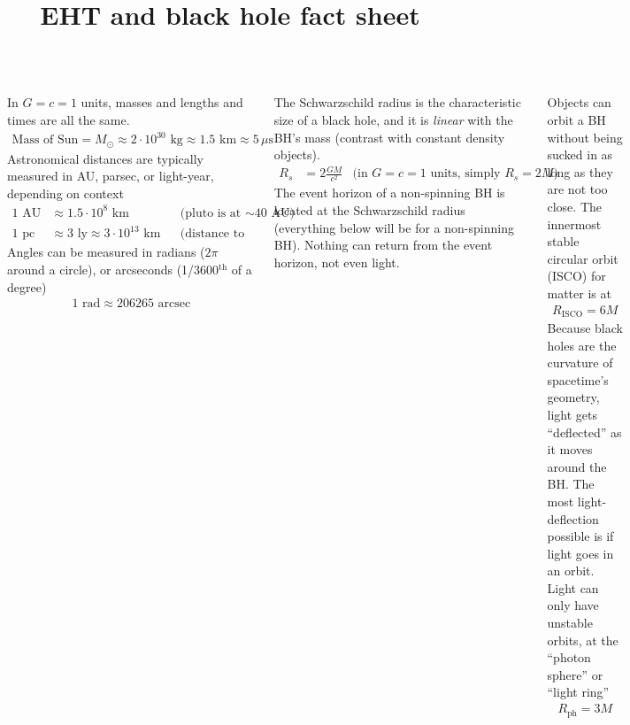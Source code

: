 \documentclass[25pt, a0paper, landscape]{tikzposter}
\title{EHT and black hole fact sheet}
\begin{document}
 
\maketitle

\linespread{1.25}

\begin{columns}
    {
      In $G=c=1$ units, masses and lengths and times are all the same.
      \begin{align*}
        \text{Mass of Sun} = M_{\odot} \approx 2\cdot 10^{30} \text{ kg}
        \approx 1.5 \text{ km} \approx 5 \, \mu\text{s}
      \end{align*}
      Astronomical distances are typically measured in AU, parsec, or
      light-year, depending on context
      \begin{align*}
        1 \text{ AU} &\approx 1.5\cdot 10^8 \text{ km} && \text{(pluto is at $\sim$40 AU)} \\
        1 \text{ pc} &\approx 3 \text{ ly} \approx 3\cdot 10^{13}\text{ km}	&&	\text{(distance to Alpha Cen is 1.3 pc)}
      \end{align*}
      Angles can be measured in radians ($2\pi$ around a circle), or
      arcseconds (1/3600$^{\text{th}}$ of a degree)
      \begin{align*}
        1 \text{ rad} \approx 206265 \text{ arcsec}
      \end{align*}

    }

    {\setlength{\parskip}{1cm plus 4mm minus 3mm}

      The Schwarzschild radius is the characteristic size of a black
      hole, and it is \emph{linear} with the BH’s mass (contrast with
      constant density objects).
        \begin{align*}
          R_{s} &= 2\frac{GM}{c^{2}} & \text{(in $G=c=1$ units, simply $R_s = 2M$)}
        \end{align*}
      The event horizon of a non-spinning BH is located at the
      Schwarzschild radius (everything below will be for a
      non-spinning BH). Nothing can return from the event horizon, not
      even light.

      Objects can orbit a BH without being sucked in as long as they
      are not too close. The innermost stable circular orbit (ISCO)
      for matter is at
      \begin{align*}
        R_{\text{ISCO}} = 6M
      \end{align*}
      Because black holes are the curvature of spacetime’s geometry,
      light gets ``deflected'' as it moves around the BH. The most
      light-deflection possible is if light goes in an orbit. Light
      can only have unstable orbits, at the ``photon sphere'' or
      ``light ring''
      \begin{align*}
        R_{\text{ph}} = 3M
      \end{align*}

}
\end{columns}
\end{document}
